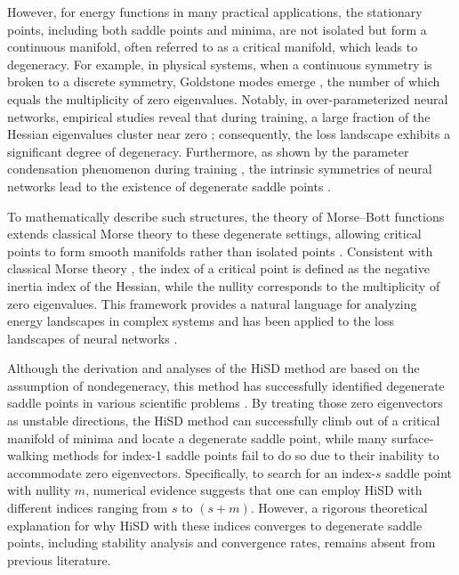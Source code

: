 \documentclass[final]{siamart251216}
\begin{document}
However, for energy functions in many practical applications, the stationary points, including both saddle points and minima, are not isolated but form a continuous manifold, often referred to as a critical manifold, which leads to degeneracy.
For example, in physical systems, when a continuous symmetry is broken to a discrete symmetry, Goldstone modes emerge \cite{goldstone1962broken}, the number of which equals the multiplicity of zero eigenvalues. 
Notably, in over-parameterized neural networks, empirical studies reveal that during training, a large fraction of the Hessian eigenvalues cluster near zero \cite{sagun2018}; consequently, the loss landscape exhibits a significant degree of degeneracy. 
Furthermore, as shown by the parameter condensation phenomenon during training \cite{luo2021phase}, the intrinsic symmetries of neural networks lead to the existence of degenerate saddle points \cite{zhang2021embedding}.

To mathematically describe such structures, the theory of Morse--Bott functions extends classical Morse theory to these degenerate settings, allowing critical points to form smooth manifolds rather than isolated points \cite{banyaga2010morse}. 
Consistent with classical Morse theory \cite{milnormorse}, the index of a critical point is defined as the negative inertia index of the Hessian, while the nullity corresponds to the multiplicity of zero eigenvalues.
This framework provides a natural language for analyzing energy landscapes in complex systems and has been applied to the loss landscapes of neural networks \cite{zhang2025geometry}.

Although the derivation and analyses of the HiSD method are based on the assumption of nondegeneracy, this method has successfully identified degenerate saddle points in various scientific problems \cite{yin2021transition, yin2022solution, yin2022constrained, yin2024revealing}. 
By treating those zero eigenvectors as unstable directions, the HiSD method can successfully climb out of a critical manifold of minima and locate a degenerate saddle point, while many surface-walking methods for index-1 saddle points fail to do so due to their inability to accommodate zero eigenvectors.
Specifically, to search for an index-$s$ saddle point with nullity $m$, numerical evidence suggests that one can employ HiSD with different indices ranging from $s$ to $(s+m)$. 
However, a rigorous theoretical explanation for why HiSD with these indices converges to degenerate saddle points, including stability analysis and convergence rates, remains absent from previous literature.
\end{document}

